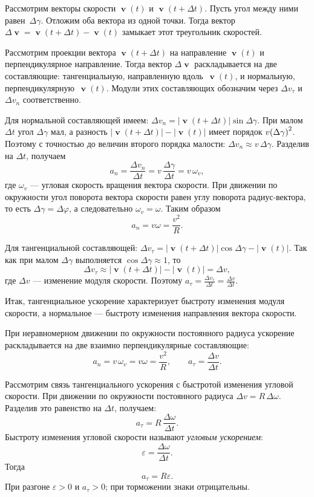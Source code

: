 \documentclass[../main.tex]{subfiles}
\begin{document}
Рассмотрим векторы скорости
$\mbfv(t)$ и $\mbfv(t + \Delta t)$. Пусть угол между ними равен~$\Delta\gamma$. Отложим оба вектора из одной точки. Тогда вектор
$\Delta\mbfv = \mbfv(t + \Delta t) - \mbfv(t)$ замыкает этот треугольник скоростей.

Рассмотрим проекции вектора $\mbfv(t + \Delta t)$ на направление 
$\mbfv(t)$ и перпендикулярное направление. Тогда вектор $\Delta\mbfv$
раскладывается на две составляющие: тангенциальную, направленную вдоль~$\mbfv(t)$, и нормальную, перпендикулярную~$\mbfv(t)$. Модули этих составляющих обозначим через $\Delta v_\tau$ и $\Delta v_n$ соответственно. 


Для нормальной составляющей имеем: $\Delta v_n = |\mbfv(t + \Delta t)|\sin\Delta\gamma$. При малом $\Delta t$ угол $\Delta\gamma$ мал, а разность
$|\mbfv(t + \Delta t)| - |\mbfv(t)|$ имеет порядок $v \qty(\Delta \gamma)^{2}$.
Поэтому с точностью до величин второго порядка малости: $\Delta v_n \approx v\,\Delta\gamma$. Разделив на $\Delta t$, получаем
\[
a_n = \frac{\Delta v_n}{\Delta t}
= v\,\frac{\Delta\gamma}{\Delta t}
= v\,\omega_v,
\]
где $\omega_v$ --- угловая скорость вращения вектора скорости. При движении по окружности угол поворота вектора скорости равен углу
поворота радиус-вектора, то есть $\Delta\gamma = \Delta\varphi$, а следовательно $\omega_{v} = \omega$. Таким образом
\[
a_n = v\omega = \frac{v^2}{R}.
\]

Для тангенциальной составляющей: $\Delta v_\tau = |\mbfv(t + \Delta t)|\cos\Delta\gamma - |\mbfv(t)|$. Так как при малом $\Delta\gamma$ выполняется $\cos\Delta\gamma \approx 1$,
то
\[
\Delta v_\tau \approx |\mbfv(t + \Delta t)| - |\mbfv(t)| = \Delta v,
\]
где $\Delta v$ --- изменение модуля скорости. Поэтому
$a_\tau = \frac{\Delta v_\tau}{\Delta t} = \frac{\Delta v}{\Delta t}$.

Итак, тангенциальное ускорение характеризует быстроту изменения модуля скорости, а нормальное --- быстроту изменения направления вектора скорости.

\begin{definition}
При неравномерном движении по окружности постоянного радиуса ускорение
раскладывается на две взаимно перпендикулярные составляющие:
\[
a_n = v\,\omega_v = v\omega = \frac{v^2}{R},
\qquad
a_\tau = \frac{\Delta v}{\Delta t}.
\]
\end{definition}

Рассмотрим связь тангенциального ускорения с быстротой изменения угловой скорости. При движении по окружности постоянного радиуса $\Delta v = R\,\Delta\omega$. Разделив это равенство на $\Delta t$, получаем:
\[
a_\tau = R\,\frac{\Delta\omega}{\Delta t}.
\]
Быстроту изменения угловой скорости называют \textit{угловым ускорением}:
\[
\varepsilon = \frac{\Delta\omega}{\Delta t}.
\]
Тогда
\[
a_\tau = R\varepsilon.
\]
При разгоне $\varepsilon > 0$ и $a_\tau > 0$; при торможении знаки отрицательны.
\end{document}
